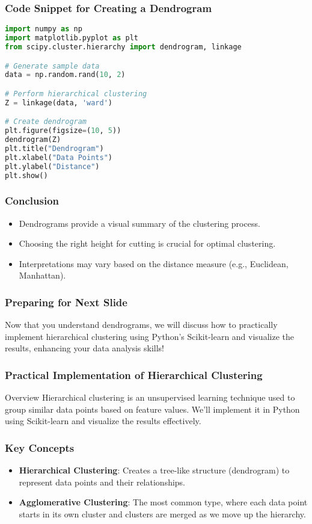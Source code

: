 \documentclass[aspectratio=169]{beamer}
\begin{document}
\begin{frame}[fragile]
    \frametitle{Code Snippet for Creating a Dendrogram}
    \begin{lstlisting}[language=Python]
import numpy as np
import matplotlib.pyplot as plt
from scipy.cluster.hierarchy import dendrogram, linkage

# Generate sample data
data = np.random.rand(10, 2)

# Perform hierarchical clustering
Z = linkage(data, 'ward')

# Create dendrogram
plt.figure(figsize=(10, 5))
dendrogram(Z)
plt.title("Dendrogram")
plt.xlabel("Data Points")
plt.ylabel("Distance")
plt.show()
    \end{lstlisting}
\end{frame}

\begin{frame}[fragile]
    \frametitle{Conclusion}
    \begin{itemize}
        \item Dendrograms provide a visual summary of the clustering process.
        \item Choosing the right height for cutting is crucial for optimal clustering.
        \item Interpretations may vary based on the distance measure (e.g., Euclidean, Manhattan).
    \end{itemize}
\end{frame}

\begin{frame}[fragile]
    \frametitle{Preparing for Next Slide}
    Now that you understand dendrograms, we will discuss how to practically implement hierarchical clustering using Python's Scikit-learn and visualize the results, enhancing your data analysis skills!
\end{frame}

\begin{frame}[fragile]
    \frametitle{Practical Implementation of Hierarchical Clustering}
    \begin{block}{Overview}
        Hierarchical clustering is an unsupervised learning technique used to group similar data points based on feature values. 
        We'll implement it in Python using Scikit-learn and visualize the results effectively.
    \end{block}
\end{frame}

\begin{frame}[fragile]
    \frametitle{Key Concepts}
    \begin{itemize}
        \item \textbf{Hierarchical Clustering}: Creates a tree-like structure (dendrogram) to represent data points and their relationships.
        \item \textbf{Agglomerative Clustering}: The most common type, where each data point starts in its own cluster and clusters are merged as we move up the hierarchy.
    \end{itemize}
\end{frame}
\end{document}
